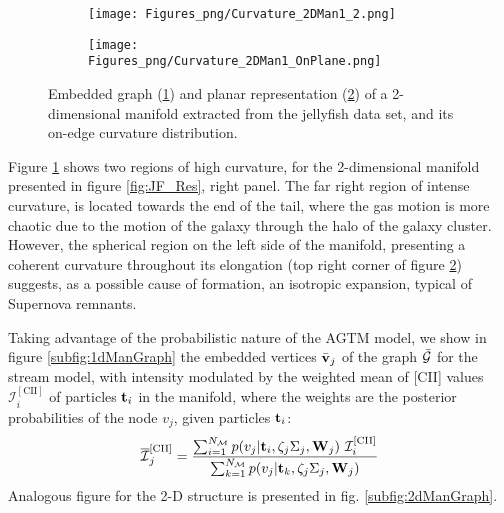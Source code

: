 \begin{figure}[ht]
\centering
\begin{subfigure}[t]{0.48\textwidth}
 \label{subfig:CurvJF}
 \caption{}
 \texttt{[image: Figures\_png/Curvature\_2DMan1\_2.png]}
\end{subfigure}
\begin{subfigure}[t]{0.49\textwidth}
 \label{subfig:CurvJF_Plane}
 \caption{}
 \texttt{[image: Figures\_png/Curvature\_2DMan1\_OnPlane.png]}
\end{subfigure}
\caption{Embedded graph (\ref{subfig:CurvJF}) and planar representation (\ref{subfig:CurvJF_Plane}) of a 2-dimensional manifold extracted from the jellyfish data set, and its on-edge curvature distribution.}
\label{fig:curvatureJF}
\end{figure}

Figure \ref{subfig:CurvJF} shows two regions of high curvature, for the 2-dimensional manifold presented in figure \ref{fig:JF_Res}, right panel. The far right region of intense curvature, is located towards the end of the tail, where the gas motion is more chaotic due to the motion of the galaxy through the halo of the galaxy cluster. However, the spherical region on the left side of the manifold, presenting a coherent curvature throughout its elongation (top right corner of figure \ref{subfig:CurvJF_Plane}) suggests, as a possible cause of formation, an isotropic expansion, typical of Supernova remnants. 

Taking advantage of the probabilistic nature of the AGTM model, we show in figure \ref{subfig:1dManGraph} the embedded vertices
$\bar{\boldsymbol{\mathbf{v}}}_j$ of the graph $\bar{\cal G}$
for the stream model, with intensity modulated by the weighted mean of [CII] values $\mathcal{I}^{\mathrm{[CII]}}_i$ of particles $\boldsymbol{\mathbf{t}}_i$ in the manifold, where the weights are the posterior probabilities of the node $v_j$, given  particles $\boldsymbol{\mathbf{t}}_i$:
\begin{equation}\label{eq:WeightedVar}
    \overline{\mathcal{I}}^{\mathrm{[CII]}}_j = \frac{\sum_{i=1}^{N_{\mathcal{M}}} p(v_j | \boldsymbol{\mathbf{t}}_i,\zeta_j\Sigma_j,\boldsymbol{\mathbf{W}}_j) ~ \mathcal{I}^{\mathrm{[CII]}}_i}{\sum_{k=1}^{N_{\mathcal{M}}} p(v_j | \boldsymbol{\mathbf{t}}_k,\zeta_j\Sigma_j,\boldsymbol{\mathbf{W}}_j)}
\end{equation}
Analogous figure for the 2-D structure is presented in fig. \ref{subfig:2dManGraph}.

